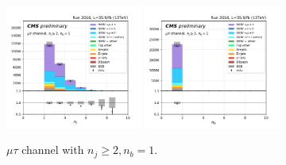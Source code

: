\begin{figure}[ht]
    \includegraphics[width=0.4\textwidth]{chapters/Analysis/sectionPlots/figures/kinematics_pickles/mutau/1b/mutau_1b_nJets.pdf}
    \includegraphics[width=0.4\textwidth]{chapters/Analysis/sectionPlots/figures/kinematics_pickles/mutau/1b/mutau_1b_nBJets.pdf}
    
    \caption{$\mu\tau$ channel with $n_j\geq2, n_b=1$.}
\end{figure}

